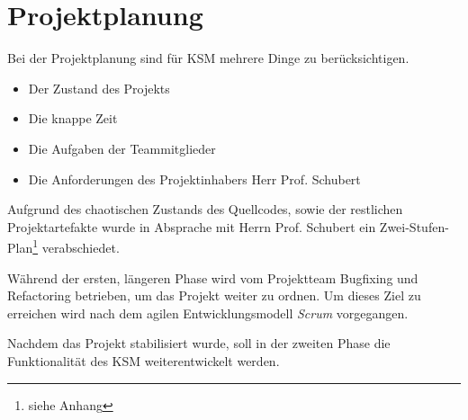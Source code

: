 \section{Projektplanung} \label{planung}

Bei der Projektplanung sind für KSM mehrere Dinge zu berücksichtigen. 
\begin{itemize}
\item Der Zustand des Projekts
\item Die knappe Zeit
\item Die Aufgaben der Teammitglieder
\item Die Anforderungen des Projektinhabers Herr Prof. Schubert
\end{itemize}

Aufgrund des chaotischen Zustands des Quellcodes, sowie der restlichen Projektartefakte wurde in Absprache mit Herrn Prof. Schubert ein Zwei-Stufen-Plan\footnote{siehe Anhang} verabschiedet. 

Während der ersten, längeren Phase wird vom Projektteam Bugfixing und Refactoring betrieben, um das Projekt weiter zu ordnen. Um dieses Ziel zu erreichen wird nach dem agilen Entwicklungsmodell \emph{Scrum} vorgegangen.

Nachdem das Projekt stabilisiert wurde, soll in der zweiten Phase die Funktionalität des KSM weiterentwickelt werden. 